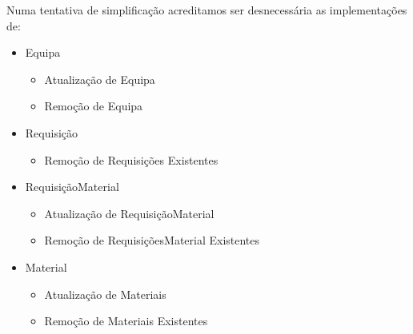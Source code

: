 Numa tentativa de simplificação acreditamos ser desnecessária as implementações de:
\begin{itemize}
    \item Equipa
    \begin{itemize}
        \item Atualização de Equipa
        \item Remoção de Equipa
    \end{itemize}
    
    \item Requisição
    \begin{itemize}
        \item Remoção de Requisições Existentes
    \end{itemize}
    
    \item RequisiçãoMaterial
    \begin{itemize}
        \item Atualização de RequisiçãoMaterial
        \item Remoção de RequisiçõesMaterial Existentes
    \end{itemize}
    
    \item Material
    \begin{itemize}
        \item Atualização de Materiais
        \item Remoção de Materiais Existentes
    \end{itemize}
\end{itemize}